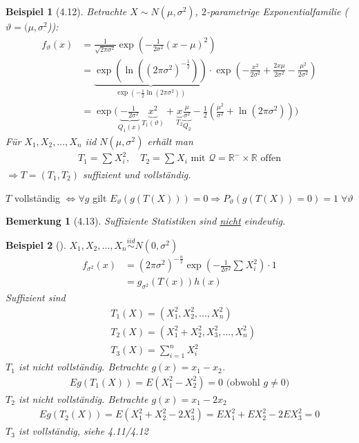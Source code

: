 \documentclass[a4paper,openany]{book}
\theoremstyle{mytheoremstyle}
\newtheorem*{bei}{Beispiel}
\newtheorem*{bem}{Bemerkung}
\theoremstyle{mytheoremstyle2}
\begin{document}
\begin{bei}[4.12]
  Betrachte $X\sim N(\mu ,\sigma ^2)$, $2$-parametrige Exponentialfamilie ($\vartheta =(\mu ,\sigma ^2$)):
  \begin{align*}
    f _{\vartheta }(x)
    &=\frac{1}{\sqrt{2 \pi \sigma ^2}}\exp \left(-\frac{1}{2 \sigma ^2}(x-\mu )^2\right) \\
    &=\underbrace{\exp(\ln((2\pi \sigma ^2)^{-\frac{1}{2}}))}_{\exp(-\frac{1}{2}\ln(2 \pi \sigma ^2))}\cdot \exp \left(-\frac{x^2}{2 \sigma ^2}+\frac{2x \mu }{2 \sigma ^2}-\frac{\mu ^2}{2 \sigma ^2}\right) \\
    &=\exp \bigg(\underbrace{-\frac{1}{2 \sigma ^2}}_{Q_1(x)}\underbrace{x^2}_{T_1(\vartheta )}+\underbrace{x}_{T_2} \underbrace{\frac{\mu }{\sigma ^2}}_{Q_2}-\frac{1}{2}\left(\frac{\mu ^2}{\sigma ^2}+\ln(2 \pi \sigma ^2)\right)\bigg)
  \end{align*}
  Für $X_1,X_2,...,X_n $ iid $N(\mu ,\sigma ^2)$ erhält man
  \begin{align*}
    T_1=\sum_{}^{}{X_i^2},\quad T_2=\sum_{}^{}{X_i}\text{ mit } \mathcal{Q}=\mathbb{R}^- \times \mathbb{R} \text{ offen}
  \end{align*}
  $\Rightarrow T=(T_1,T_2)$ suffizient und vollständig. \\
\end{bei}
$T$ vollständig $\Leftrightarrow \forall g$ gilt $E _{\vartheta }(g(T(X)))=0 \Rightarrow P _{\vartheta }(g(T(X))=0)=1 \; \forall \vartheta $  
\begin{bem}[4.13]
  Suffiziente Statistiken sind \underline{nicht} eindeutig.
\end{bem}
\begin{bei}[]
  $X_1,X_2,...,X_n \overset{iid}\sim N(0,\sigma ^2)$ 
  \begin{align*}
    f _{\sigma ^2}(x)
    &=(2 \pi \sigma ^2)^{-\frac{n}{2}}\exp \left(-\frac{1}{2 \sigma ^2}\sum_{}^{}{X_i^2}\right)\cdot 1 \\
    &=g _{\sigma ^2}(T(x))h(x)
  \end{align*}
  Suffizient sind 
  \begin{align*}
    & T_1(X)=(X_1^2,X_2^2,...,X_n^2 )\\
    & T_2(X)=(X_1^2+X_2^2,X_3^2,...,X_n^2)\\
    & T_3(X)=\sum_{i=1}^{n}{X_i^2}
  \end{align*}
  $T_1$ ist nicht vollständig. Betrachte $g(x)=x_1-x_2$. 
  \begin{align*}
    Eg(T_1(X))=E(X_1^2-X_2^2)=0 \text{ (obwohl }g \neq 0 \text{)}
  \end{align*}
  $T_2$ ist nicht vollständig. Betrachte $g(x)=x_1-2x_2$ 
  \begin{align*}
    Eg(T_2(X))=E(X_1^2+X_2^2-2X_3^2)=EX_1^2+EX_2^2-2EX_3^2=0
  \end{align*}
  $T_3$ ist vollständig, siehe 4.11/4.12
\end{bei}
\end{document}
